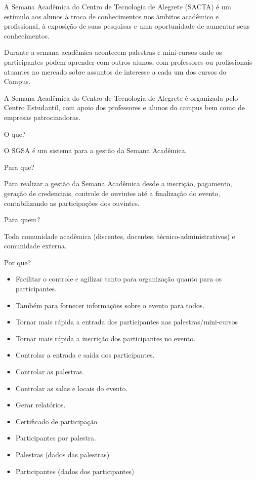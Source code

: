 \documentclass[12pt,a4paper]{article}
\begin{document}
        \begin{onehalfspace}
		A Semana Acadêmica do Centro de Tecnologia de Alegrete (SACTA) é um estímulo aos alunos à troca de conhecimentos nos âmbitos acadêmico e profissional, à exposição de suas pesquisas e uma oportunidade de aumentar seus conhecimentos.
        
        Durante a semana acadêmica acontecem palestras e mini-cursos onde os participantes podem aprender com outros alunos, com professores ou profissionais atuantes no mercado sobre assuntos de interesse a cada um dos cursos do Campus.
        
        A Semana Acadêmica do Centro de Tecnologia de Alegrete é organizada pelo Centro Estudantil, com apoio dos professores e alunos do campus bem como de empresas patrocinadoras.
        
        O que?
        
        O SGSA é um sistema para a gestão da Semana Acadêmica.
        
        Para que?
        
        Para realizar a gestão da Semana Acadêmica desde a inscrição, pagamento, geração de credenciais, controle de ouvintes até a finalização do evento, contabilizando as participações dos ouvintes.
        
        Para quem?
        
        Toda comunidade acadêmica (discentes, docentes, técnico-administrativos) e comunidade externa.
        
        Por que?
        \begin{itemize}
        \item Facilitar o controle e agilizar tanto para organização quanto para os participantes.
        \item Também para fornecer informações sobre o evento para todos.
        \item Tornar mais rápida a entrada dos participantes nas palestras/mini-cursos
        \item Tornar mais rápida a inscrição dos participantes no evento.
        \item Controlar a entrada e saída dos participantes.
        \item Controlar as palestras.
        \item Controlar as salas e locais do evento.
        \item Gerar relatórios.
        \item Certificado de participação
        \item Participantes por palestra.
        \item Palestras (dados das palestras)
        \item Participantes (dados dos participantes)
        \end{itemize}
        

\end{onehalfspace}
\end{document}
